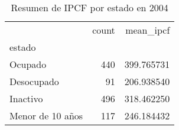 \begin{table}
\caption{Resumen de IPCF por estado en 2004}
\label{tab:ipcf_estado_2004}
\begin{tabular}{lrr}
\toprule
 & count & mean_ipcf \\
estado &  &  \\
\midrule
Ocupado & 440 & 399.765731 \\
Desocupado & 91 & 206.938540 \\
Inactivo & 496 & 318.462250 \\
Menor de 10 años & 117 & 246.184432 \\
\bottomrule
\end{tabular}
\end{table}
